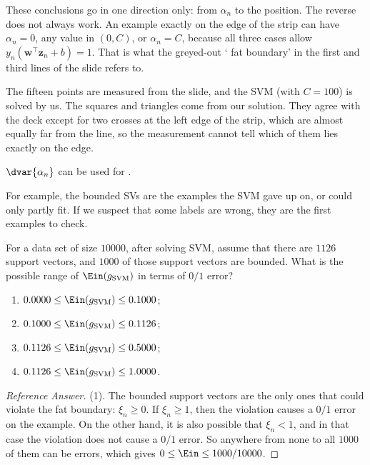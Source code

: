 These conclusions go in one direction only: from \(\alpha_n\) to the
position. The reverse does not always work. An example exactly on the edge
of the strip can have \(\alpha_n = 0\), any value in \((0, C)\), or \(\alpha_n
= C\), because all three cases allow \(y_n (\bm{w}^\top \bm{z}_n + b) = 1\).
That is what the greyed-out ` fat boundary' in the first and third
lines of the slide refers to.

\begin{note}
    The fifteen points are measured from the slide, and the SVM (with \(C =
    100\)) is solved by us. The squares and triangles come from our
    solution. They agree with the deck except for two crosses at the left
    edge of the strip, which are almost equally far from the line, so the
    measurement cannot tell which of them lies exactly on the edge.
\end{note}

\begin{moral}
    \(\dvar{\alpha_n}\) can be used for .
\end{moral}

For example, the bounded SVs are the examples the SVM gave up on, or could
only partly fit. If we suspect that some labels are wrong, they are the
first examples to check.

\begin{exercise}
    For a data set of size \(10000\), after solving SVM, assume that there
    are \(1126\) support vectors, and \(1000\) of those support vectors are
    bounded. What is the possible range of \(\Ein(g_{\mathrm{SVM}})\) in
    terms of \(0/1\) error?
    \begin{enumerate}[(1)]
        \item \(0.0000 \le \Ein(g_{\mathrm{SVM}}) \le 0.1000\);
        \item \(0.1000 \le \Ein(g_{\mathrm{SVM}}) \le 0.1126\);
        \item \(0.1126 \le \Ein(g_{\mathrm{SVM}}) \le 0.5000\);
        \item \(0.1126 \le \Ein(g_{\mathrm{SVM}}) \le 1.0000\).
    \end{enumerate}
\end{exercise}

\begin{proof}[Reference Answer]
    (1). The bounded support vectors are the only ones that could violate the
    fat boundary: \(\xi_n \ge 0\). If \(\xi_n \ge 1\), then the violation
    causes a \(0/1\) error on the example. On the other hand, it is also
    possible that \(\xi_n < 1\), and in that case the violation does not
    cause a \(0/1\) error. So anywhere from none to all \(1000\) of them can
    be errors, which gives \(0 \le \Ein \le 1000/10000\).
\end{proof}

